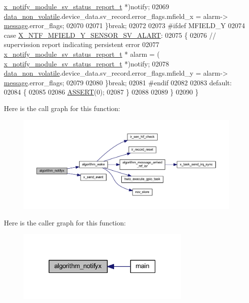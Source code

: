 \begin{DoxyCode}
      \hyperlink{a00021_d7/d1b/a00864}{x\_notify\_module\_sv\_status\_report\_t} *)notify;
02069             \hyperlink{a00060_a76ac5f917f5308dcd83de0d7c94559fb}{data\_non\_volatile}.device\_data.sv\_record.error\_flags.mfield\_x = alarm->
      \hyperlink{a00021_a13393a2d1589483b3bae4d2e79f43980}{message}.error\_flags;
02070       
02071         \}\textcolor{keywordflow}{break};
02072 
02073 \textcolor{preprocessor}{#ifdef MFIELD\_Y}
02074         \textcolor{keywordflow}{case}  \hyperlink{a00021_ad30200601c6761f2c9be1fd62df00421}{X\_NTF\_MFIELD\_Y\_SENSOR\_SV\_ALART}:
02075         \{        
02076             \textcolor{comment}{// supervission report indicating persistent error}
02077             \hyperlink{a00021_d7/d1b/a00864}{x\_notify\_module\_sv\_status\_report\_t} * alarm = (
      \hyperlink{a00021_d7/d1b/a00864}{x\_notify\_module\_sv\_status\_report\_t} *)notify;
02078             \hyperlink{a00060_a76ac5f917f5308dcd83de0d7c94559fb}{data\_non\_volatile}.device\_data.sv\_record.error\_flags.mfield\_y = alarm->
      \hyperlink{a00021_a13393a2d1589483b3bae4d2e79f43980}{message}.error\_flags;
02079             
02080         \}\textcolor{keywordflow}{break};
02081 \textcolor{preprocessor}{#endif}
02082 
02083         \textcolor{keywordflow}{default}:
02084         \{
02085 
02086             \hyperlink{a00072_abb8ff8e213ac9f6fb21d2b968583b936}{ASSERT}(0);
02087         \}
02088         
02089     \}
02090 \}
\end{DoxyCode}


Here is the call graph for this function\+:\nopagebreak
\begin{figure}[H]
\begin{center}
\leavevmode
\includegraphics[width=350pt]{d8/d41/a00038_a93269cdec3e21934aa9395440a2de605_cgraph}
\end{center}
\end{figure}




Here is the caller graph for this function\+:\nopagebreak
\begin{figure}[H]
\begin{center}
\leavevmode
\includegraphics[width=244pt]{d8/d41/a00038_a93269cdec3e21934aa9395440a2de605_icgraph}
\end{center}
\end{figure}


